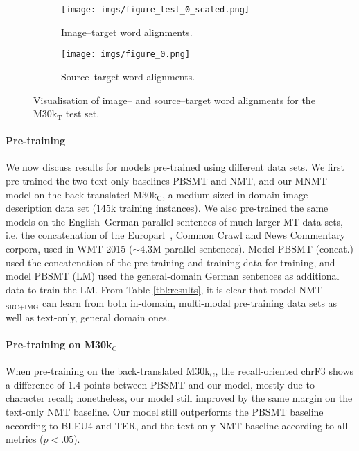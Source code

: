 \documentclass[11pt]{article}
\begin{document}
\begin{figure*}[ht!]
 \centering
 \begin{subfigure}{0.45\linewidth}
   \hfill
   \texttt{[image: imgs/figure\_test\_0\_scaled.png]}
   \caption{Image--target word alignments.}
 \end{subfigure}
 \begin{subfigure}{0.54\linewidth}
   \centering
   \texttt{[image: imgs/figure\_0.png]}
   \caption{Source--target word alignments.}
 \end{subfigure}
 \caption{Visualisation of image-- and source--target word alignments for the M30k$_\text{T}$ test set.}
 \label{fig:attention}
\end{figure*}


\paragraph{Pre-training}

We now discuss results for models pre-trained using different data sets.
We first pre-trained the two text-only baselines PBSMT and NMT, and our MNMT model on the back-translated M30k$_\text{C}$, a medium-sized in-domain image description data set ($145$k training instances).
We also pre-trained the same models on the English--German parallel sentences of much larger MT data sets, i.e. the concatenation of the Europarl~\cite{Koehn2005}, Common Crawl and News Commentary corpora, used in WMT 2015 ($\sim$$4.3$M parallel sentences).
Model PBSMT (concat.) used the concatenation of the pre-training and training data for training, and model PBSMT (LM) used the general-domain German sentences as additional data to train the LM.
From Table \ref{tbl:results}, it is clear that model NMT$_{\text{SRC+IMG}}$ can learn from both in-domain, multi-modal pre-training data sets as well as text-only, general domain ones.


\paragraph{Pre-training on M30k$_\text{C}$}

When pre-training on the back-translated M30k$_\text{C}$, the recall-oriented chrF3 shows a difference of $1.4$ points between PBSMT and our model, mostly due to character recall; nonetheless, our model still improved by the same margin on the text-only NMT baseline.
Our model still outperforms the PBSMT baseline according to BLEU4 and TER, and the text-only NMT baseline according to all metrics ($p<.05$).
\end{document}
